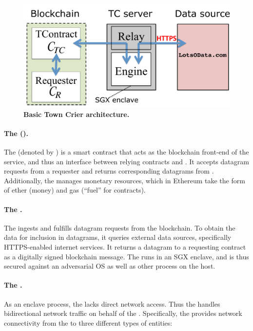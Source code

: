 \vspace{-2mm}
\begin{figure}[h!]
\centering
\includegraphics[width=\columnwidth]{figures/OverviewFig}
\caption{{\bf Basic Town Crier architecture.}}
\label{fig:overview}
\end{figure}
\vspace{-2mm}

\paragraph{The \tcontract (\tcont).} The \tcontract (denoted by \tcont) is a smart contract that acts as the blockchain front-end of the \tc service, and thus an interface between relying contracts and \tc. It accepts datagram requests from a requester \reqcont and returns corresponding datagrams from \tc. Additionally, the \tcontract manages \tc monetary resources, which in Ethereum take the form of ether (money) and gas (``fuel'' for contracts). 

\paragraph{The \encname.}
The \encname ingests and fulfills datagram requests from the blockchain. To obtain the data for inclusion in datagrams, it queries external data sources, specifically HTTPS-enabled internet services. It returns a datagram to a requesting contract \reqcont as a digitally signed blockchain message. The \encname runs in an SGX enclave, and is thus secured against an adversarial OS as well as other process on the host. 

\paragraph{The \medname.} As an enclave process, the \encname lacks direct network access. Thus the \medname handles bidirectional network traffic on behalf of the \encname. Specifically, the \medname provides network connectivity from the \encname to three different types of entities: 

